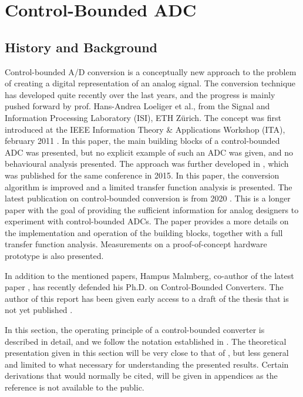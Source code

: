 
\chapter{Control-Bounded ADC}
\label{sec:cbadc}
\section{History and Background}
Control-bounded A/D conversion is a conceptually new approach to the problem of creating a digital representation of an analog signal. The conversion technique has developed quite recently over the last years, and the progress is mainly pushed forward by prof. Hans-Andrea Loeliger et al., from the Signal and Information Processing Laboratory (ISI), ETH Zürich. The concept was first introduced at the IEEE Information Theory \& Applications Workshop (ITA), february 2011 \cite{cbc_2011_loeliger}. In this paper, the main building blocks of a control-bounded ADC was presented, but no explicit example of such an ADC was given, and no behavioural analysis presented. The approach was further developed in \cite{cbc_2015_loeliger}, which was published for the same conference in 2015. In this paper, the conversion algorithm is improved and a limited transfer function analysis is presented. The latest publication on control-bounded conversion is from 2020 \cite{cbc_2020_loeliger}. This is a longer paper with the goal of providing the sufficient information for analog designers to experiment with control-bounded ADCs. The paper provides a more details on the implementation and operation of the building blocks, together with a full transfer function analysis. Measurements on a proof-of-concept hardware prototype is also presented.

In addition to the mentioned papers, Hampus Malmberg, co-author of the latest paper \cite{cbc_2020_loeliger}, has recently defended his Ph.D. on Control-Bounded Converters. The author of this report has been given early access to a draft of the thesis that is not yet published \cite{malmberg_thesis}.

In this section, the operating principle of a control-bounded converter is described in detail, and we follow the notation established in \cite{cbc_2020_loeliger}. The theoretical presentation given in this section will be very close to that of \cite{malmberg_thesis}, but less general and limited to what necessary for understanding the presented results. Certain derivations that would normally be cited, will be given in appendices as the reference is not available to the public.


